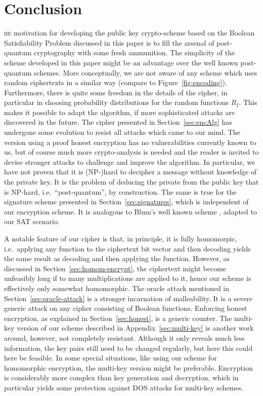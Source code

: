 \documentclass[final,journal,compsoc]{IEEEtran}
\begin{document}
\section{Conclusion\label{sec:conclusion}}
\textsc{he} motivation for developing the public key
crypto-scheme based on the Boolean Satisfiability Problem discussed in
this paper is to fill the arsenal of post-quantum cryptography with
some fresh ammunition. The simplicity of the scheme developed in this
paper might be an advantage over the well known post-quantum
schemes. More conceptually, we are not aware of any scheme which uses
random ciphertexts in a similar way (compare to
Figure~\ref{fig:encoding}).  Furthermore, there is quite some freedom
in the details of the cipher, in particular in choosing
probability distributions for the random functions $R_I$. This makes
it possible to adapt the algorithm, if more sophisticated attacks are
discovered in the future.  The cipher presented in
Section~\ref{sec:encAlg} has undergone some evolution to resist all
attacks which came to our mind. The version using a proof honest
encryption has no vulnerabilities currently known to us, but of course
much more crypto-analysis is needed and the reader is invited to
devise stronger attacks to challenge and improve the algorithm. In
particular, we have not proven that it is (NP-)hard to decipher a
message without knowledge of the private key.  It is the problem of
deducing the private from the public key that is NP-hard, i.e.\
``post-quantum'', by construction.  The same is true for the signature
scheme presented in Section~\ref{sec:signatures}, which is independent
of our encryption scheme. It is analogous to Blum's well known scheme
\cite{Blum1986}, adapted to our SAT scenario.


A notable feature of our cipher is that, in principle, it is fully
homomorpic, i.e.\ applying any function to the ciphertext bit vector and
then decoding yields the same result as decoding and then applying the
function. However, as discussed in Section~\ref{sec:homom-encrypt},
the ciphertext might become unfeasibly long if to many multiplications are
applied to it, hence our scheme is effectively only somewhat
homomorphic.  The oracle attack mentioned in
Section~\ref{sec:oracle-attack} is a stronger incarnation of
malleability. It is a severe generic attack on
any cipher consisting of Boolean functions.  Enforcing honest
encryption, as explained in Section~\ref{sec:honest}, is a generic
counter.  The multi-key version of our scheme described in
Appendix~\ref{sec:multi-key} is another work
around, however, not completely resistant. Although it only reveals much less information, the key pairs
still need to be changed regularly, but here this could here be feasible. In
some special situations, like using our scheme for homomorphic
encryption, the multi-key version might be
preferable. Encryption is considerably more complex than key
generation and decryption, which in particular yields some protection
against DOS attacks for multi-key schemes.
\end{document}
